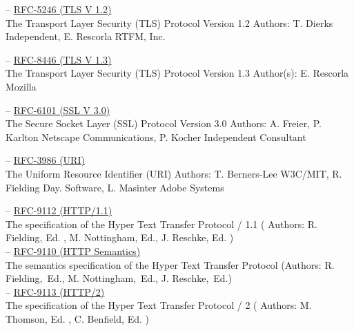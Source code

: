 \documentclass[10pt,a4paper,english]{article}
\begin{document}
\begin{multicols}{2}
\begin{flushleft}
\hspace*{1em}-- \href{https://datatracker.ietf.org/doc/html/rfc5246}{RFC-5246 (TLS V 1.2)}\\The Transport Layer Security (TLS) Protocol Version 1.2 Authors:   T. Dierks
Independent,  E. Rescorla RTFM, Inc.\\
\end{flushleft}
\begin{flushleft}
\hspace*{1em}-- \href{https://datatracker.ietf.org/doc/html/rfc8446}{RFC-8446 (TLS V 1.3)}\\The Transport Layer Security (TLS) Protocol Version 1.3 Author(s): E. Rescorla Mozilla\\
\end{flushleft}
\begin{flushleft}
\hspace*{1em}-- \href{https://datatracker.ietf.org/doc/html/rfc6101}{RFC-6101 (SSL V 3.0)}\\The Secure Socket Layer  (SSL) Protocol Version 3.0 Authors: A. Freier, P. Karlton Netscape Communications, P. Kocher Independent Consultant\\
\end{flushleft}
\begin{flushleft}
\hspace*{1em}-- \href{https://datatracker.ietf.org/doc/html/rfc3986}{RFC-3986 (URI)}\\The Uniform Resource Identifier (URI) Authors: T. Berners-Lee W3C/MIT, R. Fielding Day. Software, L. Masinter Adobe Systems\\
\end{flushleft}
\begin{flushleft}
\hspace*{1em}-- \href{https://www.rfc-editor.org/rfc/rfc9112.pdf}{RFC-9112 (HTTP/1.1)}\\The specification of the Hyper Text Transfer Protocol / 1.1 ( Authors: R. Fielding, Ed. , M. Nottingham, Ed.,  J. Reschke, Ed. ) \\
\hspace*{1em}-- \href{https://www.rfc-editor.org/rfc/rfc9110.pdf}{RFC-9110 (HTTP Semantics)} \\The semantics specification of the Hyper Text Transfer Protocol (Authors: R. Fielding, Ed., M. Nottingham, Ed., J. Reschke, Ed.)\\
\hspace*{1em}-- \href{https://www.rfc-editor.org/rfc/rfc9113.pdf}{RFC-9113 (HTTP/2)} \\The specification of the Hyper Text Transfer Protocol / 2 ( Authors:             M. Thomson, Ed. , C. Benfield, Ed. )\\

\end{flushleft}
\end{multicols}
\end{document}
